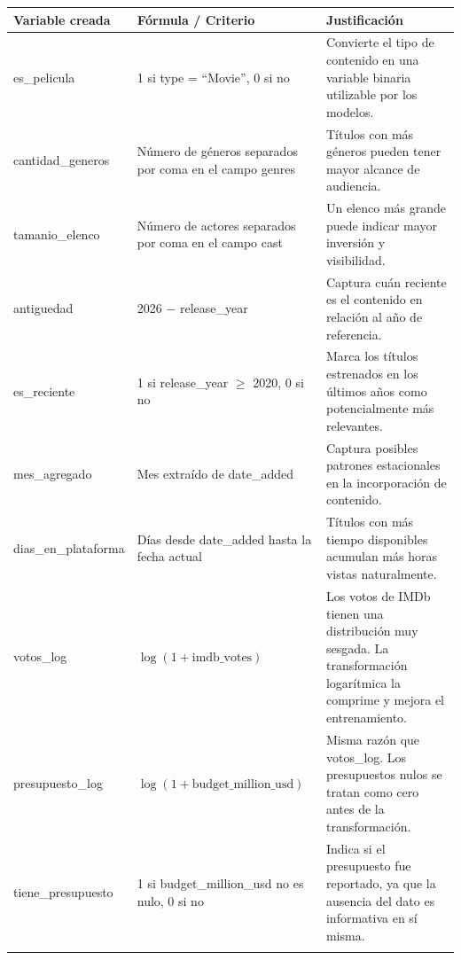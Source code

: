 \documentclass[12pt,a4paper]{article}
\begin{document}
\vspace{0.2cm}
\begin{center}
\begin{tabular}{p{3.8cm} p{5cm} p{5.2cm}}
\toprule
Variable creada & F\'ormula / Criterio & Justificaci\'on \\
\midrule
\addlinespace[0.15cm]
es\_pelicula &
1 si type = ``Movie'', 0 si no &
Convierte el tipo de contenido en una variable binaria utilizable por los modelos. \\
\addlinespace[0.3cm]
cantidad\_generos &
N\'umero de g\'eneros separados por coma en el campo genres &
T\'itulos con m\'as g\'eneros pueden tener mayor alcance de audiencia. \\
\addlinespace[0.3cm]
tamanio\_elenco &
N\'umero de actores separados por coma en el campo cast &
Un elenco m\'as grande puede indicar mayor inversi\'on y visibilidad. \\
\addlinespace[0.3cm]
antiguedad &
2026 $-$ release\_year &
Captura cu\'an reciente es el contenido en relaci\'on al a\~no de referencia. \\
\addlinespace[0.3cm]
es\_reciente &
1 si release\_year $\geq$ 2020, 0 si no &
Marca los t\'itulos estrenados en los \'ultimos a\~nos como potencialmente m\'as relevantes. \\
\addlinespace[0.3cm]
mes\_agregado &
Mes extra\'ido de date\_added &
Captura posibles patrones estacionales en la incorporaci\'on de contenido. \\
\addlinespace[0.3cm]
dias\_en\_plataforma &
D\'ias desde date\_added hasta la fecha actual &
T\'itulos con m\'as tiempo disponibles acumulan m\'as horas vistas naturalmente. \\
\addlinespace[0.3cm]
votos\_log &
$\log(1 + \text{imdb\_votes})$ &
Los votos de IMDb tienen una distribuci\'on muy sesgada. La transformaci\'on logar\'itmica la comprime y mejora el entrenamiento. \\
\addlinespace[0.3cm]
presupuesto\_log &
$\log(1 + \text{budget\_million\_usd})$ &
Misma raz\'on que votos\_log. Los presupuestos nulos se tratan como cero antes de la transformaci\'on. \\
\addlinespace[0.3cm]
tiene\_presupuesto &
1 si budget\_million\_usd no es nulo, 0 si no &
Indica si el presupuesto fue reportado, ya que la ausencia del dato es informativa en s\'i misma. \\
\addlinespace[0.15cm]
\bottomrule
\end{tabular}
\end{center}
\end{document}
